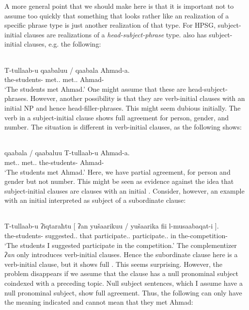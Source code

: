 \documentclass[output=paper]{langsci/langscibook}
\begin{document}
A more general point that we should make here is that it is important not to
assume too quickly that something that looks rather like an 
realization of a specific phrase type is just another realization of that type.
For \gls{HPSG},  subject-initial clauses are realizations of a
\emph{head-subject-phrase} type.  also has subject-initial clauses,
e.g. the following:

\ea\label{ex:borsley:4.26}\\
    \gll T-tullaab-u qaabaluu {/} \llap{*}qaabala Aħmad-a.\\
            the-students-\Nom{} met.\Tpl.\M{} {} met.\Tsg.\M{} Ahmad-\Acc{}\\
    \glt    \enquote*{The students met Ahmad.}
\z
%
One might assume that these are head-subject-phrases. However, another
possibility is that they are verb-initial clauses with an initial NP  and
hence head-filler-phrases. This might seem dubious initially. The verb in a
subject-initial clause shows full agreement for person, gender, and
number. The
situation is different in verb-initial clauses, as the following shows:

\ea\label{ex:borsley:4.27}\\
    \gll qaabala {/ } \llap{*}qaabaluu T-tullaab-u Aħmad-a.\\
            met.\Tsg.\M{} {} met.\Tpl.\M{} the-students-\Nom{} Ahmad-\Acc{}\\
    \glt    \enquote*{The students met Ahmad.}
\z
%
Here, we have partial agreement,  for person and gender but not
number. This might be seen as evidence against the idea that subject-initial
clauses are clauses with an initial . Consider, however, an example with
an initial  interpreted as subject of a subordinate clause:

\ea\label{ex:borsley:4.28}\\
    \gll T-tullaab-u ʔiqtaraħtu {[} ʔan yušaarikuu {/ } \llap{*}yušaarika fii l-musaabaqat-i ].\\
            the-students-\Nom{} suggested.\Fsg.\M{} {} that participate.\Tpl.\M{} {} participate.\Tsg.\M{} in the-competition-\Gen{}\\
    \glt    \enquote*{The students I suggested participate in the competition.}
\z
%
The complementizer \emph{ʔan} only introduces verb-initial clauses. Hence the
subordinate clause here is a verb-initial clause, but it shows full
.  This seems surprising. However, the problem disappears if we
assume that the clause has a null pronominal subject coindexed with a preceding
topic. Null subject sentences, which I assume have a null pronominal subject,
show full agreement. Thus, the following can only have the meaning indicated
and cannot mean that they met Ahmad:
\end{document}
